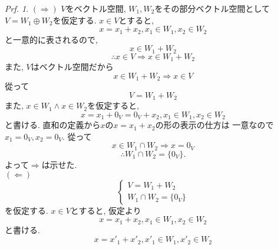\documentclass[a4paper,10pt,report]{amsart}
\theoremstyle{plain}
\theoremstyle{definition}
\theoremstyle{remark}
\newtheorem{prf}{Prf.}
\begin{document}
\begin{prf}
    \((\Rightarrow)\) \(V\)をベクトル空間, 
    \(W_{1},W_{2}\)をその部分ベクトル空間として
    \(V=W_{1}\oplus W_{2}\)を仮定する.
    \(x\in V\)とすると, 
    \begin{equation*}
        x=x_{1}+x_{2},x_{1}\in W_{1},x_{2}\in W_{2}
    \end{equation*}
    と一意的に表されるので, 
    \begin{equation*}
        x\in W_{1}+W_{2}
    \end{equation*}
    \begin{equation*}
        \therefore x\in V\Rightarrow x\in W_{1}+W_{2}
    \end{equation*}
    また, \(V\)はベクトル空間だから
    \begin{equation*}
        x\in W_{1}+W_{2}\Rightarrow x\in V
    \end{equation*}
    從って
    \begin{equation*}
        V=W_{1}+W_{2}
    \end{equation*}
    また, \(x\in W_{1}\wedge x\in W_{2}\)を仮定すると,
    \begin{equation*}
        x=x_{1}+0_{V}=0_{V}+x_{2},x_{1}\in W_{1},x_{2}\in W_{2}
    \end{equation*}
    と書ける. 直和の定義から\(x\)の\(x=x_{1}+x_{2}\)の形の表示の仕方は
    一意なので\(x_{1}=0_{V},x_{2}=0_{V}\). 從って
    \begin{equation*}
        x\in W_{1}\cap W_{2}\Rightarrow x=0_{V}
    \end{equation*}
    \begin{equation*}
        \therefore W_{1}\cap W_{2}=\{0_{V}\}.
    \end{equation*}
    よって\(\Rightarrow{}\)は示せた. \\
    \((\Leftarrow)\)
    \begin{equation*}
        \begin{cases}
            V=W_{1}+W_{2}\\
            W_{1}\cap W_{2}=\{0_{V}\}
        \end{cases}
    \end{equation*}
    を仮定する. \(x\in V\)とすると, 仮定より
    \begin{equation*}
        x=x_{1}+x_{2},x_{1}\in W_{1},x_{2}\in W_{2}
    \end{equation*}
    と書ける. 
    \begin{equation*}
        x=x'_{1}+x'_{2},x'_{1}\in W_{1},x'_{2}\in W_{2}
    \end{equation*}

\end{prf}
\end{document}
